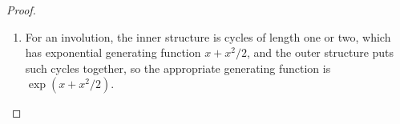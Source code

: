 \documentclass{article}
\newenvironment{problem}[2][Problem]{\begin{trivlist}
\item[\hskip \labelsep {\bfseries #1}\hskip \labelsep {\bfseries #2.}]}{\end{trivlist}}
\newcommand{\ang}[1]{\langle #1 \rangle}
\begin{document}
\begin{proof} ~
  \begin{enumerate}
    \item[(c)] For an involution, the inner structure is cycles of length one or
    two, which has exponential generating function $x+x^2/2$, and the outer
    structure puts such cycles together, so the appropriate generating function is $\exp(x + x^2/2)$.
  \end{enumerate}
\end{proof}
\pagebreak
%
%
\begin{problem}{4}
\end{problem}
\end{document}
